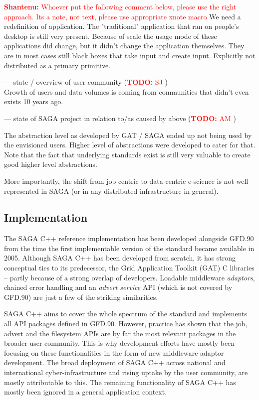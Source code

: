 \documentclass{article}
\newcommand{\B}[1]{\textbf{#1}}
\newcommand{\todo}[1]{{\textcolor{red}{\B{TODO:} #1 }}}
\newcommand{\jhanote}[1]{{\textcolor{red}{     \B{Shantenu:} #1 }}}
\newcommand{\jhanote}[1]{}
\begin{document}
\jhanote{Whoever put the following comment below, please use the right
  approach. Its a note, not text, please use appropriate xnote macro} We need a
redefinition of application. The "traditional" application that ran on
people's desktop is still very present.  Because of scale the usage
mode of these applications did change, but it didn't change the
application themselves.  They are in most cases still black boxes that
take input and create input.  Explicitly not distributed as a primary
primitive.

 --- state / overview of user community (\todo{SJ})\\
 
 Growth of users and data volumes is coming from communities that
 didn't even exists 10 years ago.
 
 
 --- state of SAGA project in relation to/as caused by above (\todo{AM})

 The abstraction level as developed by GAT / SAGA ended up not being
 used by the envisioned users.  Higher level of abstractions were
 developed to cater for that. Note that the fact that underlying
 standards exist is still very valuable to create good higher level
 abstractions.

 More importantly, the shift from job centric to data centric
 e-science is not well represented in SAGA (or in any distributed
 infrastructure in general).

\subsection{Implementation}

The SAGA C++ reference implementation has been developed alongside
GFD.90 from the time the first implementable version of the standard
became available in 2005. Although SAGA C++ has been developed from
scratch, it has strong conceptual ties to its predecessor, the Grid
Application Toolkit (GAT) C libraries -- partly because of a strong
overlap of developers.  Loadable middleware \textit{adaptors}, chained
error handling and an \textit{advert service} API (which is not
covered by GFD.90) are just a few of the striking similarities.

SAGA C++ aims to cover the whole spectrum of the standard and
implements all API packages defined in GFD.90. However, practice has
shown that the job, advert and the filesystem APIs are by far the most
relevant packages in the broader user community.  This is why
development efforts have mostly been focusing on these functionalities
in the form of new middleware adaptor development. The broad
deployment of SAGA C++ across national and international
cyber-infrastructure and rising uptake by the user community, are
mostly attributable to this. The remaining functionality of SAGA C++
has mostly been ignored in a general application context.
\end{document}
